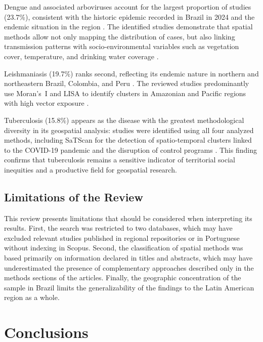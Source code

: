 \documentclass[conference]{IEEEtran}
\begin{document}
Dengue and associated arboviruses account for the largest
proportion of studies (23.7\%), consistent with the historic
epidemic recorded in Brazil in 2024 and the endemic
situation in the region \cite{Sena2025}. The identified
studies demonstrate that spatial methods allow not only
mapping the distribution of cases, but also linking
transmission patterns with socio-environmental variables
such as vegetation cover, temperature, and drinking water
coverage \cite{Siqueira2021, DzulManzanilla2021}.

Leishmaniasis (19.7\%) ranks second, reflecting its endemic
nature in northern and northeastern Brazil, Colombia, and
Peru \cite{Miranda2024, Leishmaniasis2025}. The reviewed
studies predominantly use Moran's~I and LISA to identify
clusters in Amazonian and Pacific regions with high vector
exposure \cite{Konczycki2025, deSousa2024}.

Tuberculosis (15.8\%) appears as the disease with the
greatest methodological diversity in its geospatial analysis:
studies were identified using all four analyzed methods,
including SaTScan for the detection of spatio-temporal
clusters linked to the COVID-19 pandemic and the disruption
of control programs \cite{Souza2023, Perotto2025}. This
finding confirms that tuberculosis remains a sensitive
indicator of territorial social inequities and a productive
field for geospatial research.

\subsection{Limitations of the Review}

This review presents limitations that should be considered
when interpreting its results. First, the search was
restricted to two databases, which may have excluded relevant
studies published in regional repositories or in Portuguese
without indexing in Scopus. Second, the classification of
spatial methods was based primarily on information declared
in titles and abstracts, which may have underestimated the
presence of complementary approaches described only in the
methods sections of the articles. Finally, the geographic
concentration of the sample in Brazil limits the
generalizability of the findings to the Latin American
region as a whole.

\section{Conclusions}
\end{document}

